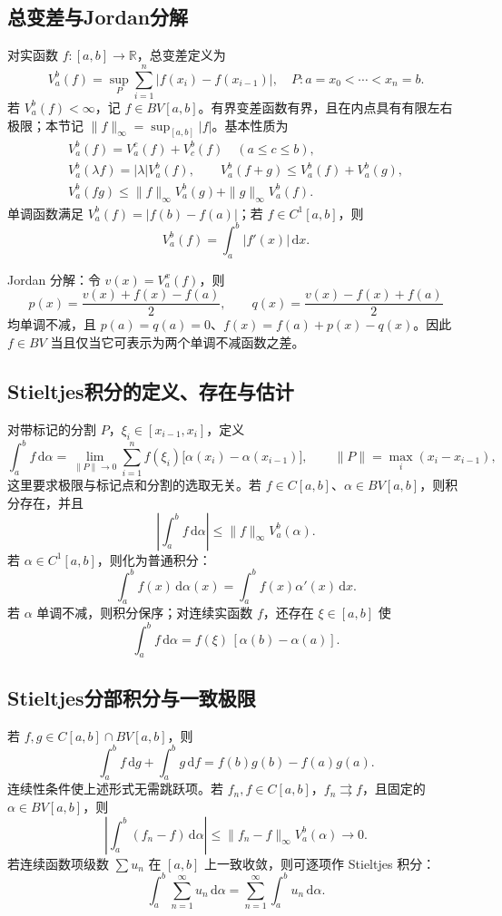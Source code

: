 \documentclass[../main.tex]{subfiles}
\begin{document}
\subsection{总变差与Jordan分解}
对实函数 $f:[a,b]\to\mathbb R$，总变差定义为
\[
V_a^b(f)=\sup_{P}\sum_{i=1}^n|f(x_i)-f(x_{i-1})|,
\quad P:a=x_0<\cdots<x_n=b.
\]
若 $V_a^b(f)<\infty$，记 $f\in BV[a,b]$。有界变差函数有界，且在内点具有有限左右极限；本节记 $\|f\|_\infty=\sup_{[a,b]}|f|$。基本性质为
\begin{gather*}
V_a^b(f)=V_a^c(f)+V_c^b(f)\quad(a\le c\le b),\\
V_a^b(\lambda f)=|\lambda|V_a^b(f),\qquad
V_a^b(f+g)\le V_a^b(f)+V_a^b(g),\\
V_a^b(fg)\le\|f\|_\infty V_a^b(g)+\|g\|_\infty V_a^b(f).
\end{gather*}
单调函数满足 $V_a^b(f)=|f(b)-f(a)|$；若 $f\in C^1[a,b]$，则
\[
V_a^b(f)=\int_a^b|f'(x)|\,\mathrm dx.
\]
\par\pagebreak[0]\begin{samepage}
Jordan 分解：令 $v(x)=V_a^x(f)$，则
\[
p(x)=\frac{v(x)+f(x)-f(a)}2,\qquad
q(x)=\frac{v(x)-f(x)+f(a)}2
\]
均单调不减，且 $p(a)=q(a)=0$、$f(x)=f(a)+p(x)-q(x)$。因此 $f\in BV$ 当且仅当它可表示为两个单调不减函数之差。
\par\end{samepage}\pagebreak[0]
\subsection{Stieltjes积分的定义、存在与估计}
对带标记的分割 $P$，$\xi_i\in[x_{i-1},x_i]$，定义
\[
\int_a^bf\,\mathrm d\alpha
=\lim_{\|P\|\to0}\sum_{i=1}^nf(\xi_i)
\bigl[\alpha(x_i)-\alpha(x_{i-1})\bigr],
\qquad\|P\|=\max_i(x_i-x_{i-1}),
\]
这里要求极限与标记点和分割的选取无关。若 $f\in C[a,b]$、$\alpha\in BV[a,b]$，则积分存在，并且
\[
\left|\int_a^bf\,\mathrm d\alpha\right|
\le\|f\|_\infty V_a^b(\alpha).
\]
若 $\alpha\in C^1[a,b]$，则化为普通积分：
\[
\int_a^bf(x)\,\mathrm d\alpha(x)
=\int_a^bf(x)\alpha'(x)\,\mathrm dx.
\]
若 $\alpha$ 单调不减，则积分保序；对连续实函数 $f$，还存在 $\xi\in[a,b]$ 使
\[
\int_a^bf\,\mathrm d\alpha=f(\xi)\,[\alpha(b)-\alpha(a)].
\]
\subsection{Stieltjes分部积分与一致极限}
若 $f,g\in C[a,b]\cap BV[a,b]$，则
\[
\int_a^bf\,\mathrm dg+\int_a^bg\,\mathrm df
=f(b)g(b)-f(a)g(a).
\]
连续性条件使上述形式无需跳跃项。若 $f_n,f\in C[a,b]$，$f_n\rightrightarrows f$，且固定的 $\alpha\in BV[a,b]$，则
\[
\left|\int_a^b(f_n-f)\,\mathrm d\alpha\right|
\le\|f_n-f\|_\infty V_a^b(\alpha)\longrightarrow0.
\]
若连续函数项级数 $\sum u_n$ 在 $[a,b]$ 上一致收敛，则可逐项作 Stieltjes 积分：
\[
\int_a^b\sum_{n=1}^\infty u_n\,\mathrm d\alpha
=\sum_{n=1}^\infty\int_a^bu_n\,\mathrm d\alpha.
\]
\end{document}

